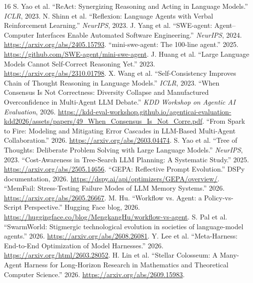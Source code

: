 \documentclass[10pt,letterpaper]{article}
\begin{document}
{\small\setlength{\itemsep}{1pt}\setlength{\parskip}{0pt}\begin{thebibliography}{16}
 S. Yao et al. ``ReAct: Synergizing Reasoning and Acting in Language Models.'' \emph{ICLR}, 2023.
 N. Shinn et al. ``Reflexion: Language Agents with Verbal Reinforcement Learning.'' \emph{NeurIPS}, 2023.
 J. Yang et al. ``SWE-agent: Agent--Computer Interfaces Enable Automated Software Engineering.'' \emph{NeurIPS}, 2024. \url{https://arxiv.org/abs/2405.15793}.
 ``mini-swe-agent: The 100-line agent.'' 2025. \url{https://github.com/SWE-agent/mini-swe-agent}.
 J. Huang et al. ``Large Language Models Cannot Self-Correct Reasoning Yet.'' 2023. \url{https://arxiv.org/abs/2310.01798}.
 X. Wang et al. ``Self-Consistency Improves Chain of Thought Reasoning in Language Models.'' \emph{ICLR}, 2023.
 ``When Consensus Is Not Correctness: Diversity Collapse and Manufactured Overconfidence in Multi-Agent LLM Debate.'' \emph{KDD Workshop on Agentic AI Evaluation}, 2026. \url{https://kdd-eval-workshop.github.io/agenticai-evaluation-kdd2026/assets/papers/49_When_Consensus_Is_Not_Corre.pdf}.
 ``From Spark to Fire: Modeling and Mitigating Error Cascades in LLM-Based Multi-Agent Collaboration.'' 2026. \url{https://arxiv.org/abs/2603.04474}.
\newpage{} S. Yao et al. ``Tree of Thoughts: Deliberate Problem Solving with Large Language Models.'' \emph{NeurIPS}, 2023.
 ``Cost-Awareness in Tree-Search LLM Planning: A Systematic Study.'' 2025. \url{https://arxiv.org/abs/2505.14656}.
 ``GEPA: Reflective Prompt Evolution.'' DSPy documentation, 2026. \url{https://dspy.ai/api/optimizers/GEPA/overview/}.
 ``MemFail: Stress-Testing Failure Modes of LLM Memory Systems.'' 2026. \url{https://arxiv.org/abs/2605.26667}.
 M. Hu. ``Workflow vs. Agent: a Policy-vs-Script Perspective.'' Hugging Face blog, 2026. \url{https://huggingface.co/blog/MengkangHu/workflow-vs-agent}.
 S. Pal et al. ``SwarmWorld: Stigmergic technological evolution in societies of language-model agents.'' 2026. \url{https://arxiv.org/abs/2608.26081}.
 Y. Lee et al. ``Meta-Harness: End-to-End Optimization of Model Harnesses.'' 2026. \url{https://arxiv.org/html/2603.28052}.
 H. Lin et al. ``Stellar Colosseum: A Many-Agent Harness for Long-Horizon Research in Mathematics and Theoretical Computer Science.'' 2026. \url{https://arxiv.org/abs/2609.15983}.
\end{thebibliography}}

\vspace{-4pt}
\end{document}
